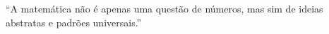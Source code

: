 “A matemática não é apenas uma questão de números, mas sim de ideias abstratas e padrões universais.”


